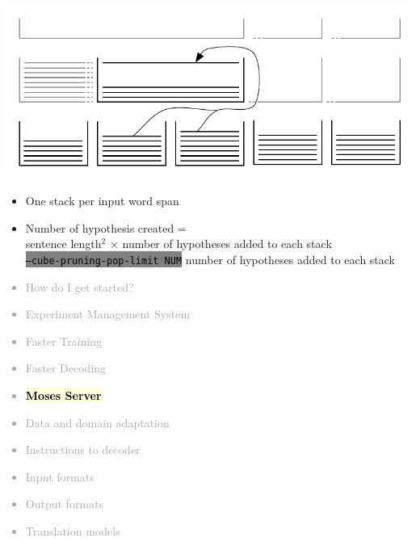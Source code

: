 \documentclass[landscape]{uedslides2C}
\newcommand{\currenttopic}[1]{\colorbox{lightyellow}{\textcolor{black}{\bf #1}}}
\newcommand{\littlecode}[1]{\colorbox{gray}{\textcolor{black}{\small \tt #1}}}
\begin{document}

\begin{center} 
\includegraphics[scale=1.5]{chart-stacks.pdf}
\end{center}
\vspace{-5mm}
\begin{itemize} \itemsep -2mm
\item One stack per input word span
\item Number of hypothesis created = \\
sentence length$^2$ $\times$  number of hypotheses added to each stack\\
\littlecode{--cube-pruning-pop-limit NUM} number of hypotheses added to each stack
\end{itemize}


\vspace{-5mm}
\textcolor{darkgrey}{
\begin{itemize} \itemsep -1mm
\item {How do I get started?}
\item {Experiment Management System}
\item {Faster Training}
\item {Faster Decoding}
\item \currenttopic{Moses Server}
\item {Data and domain adaptation}
\item {Instructions to decoder}
\item {Input formats}
\item {Output formats}
\item {Translation models}
\end{itemize}
}

\end{document}
